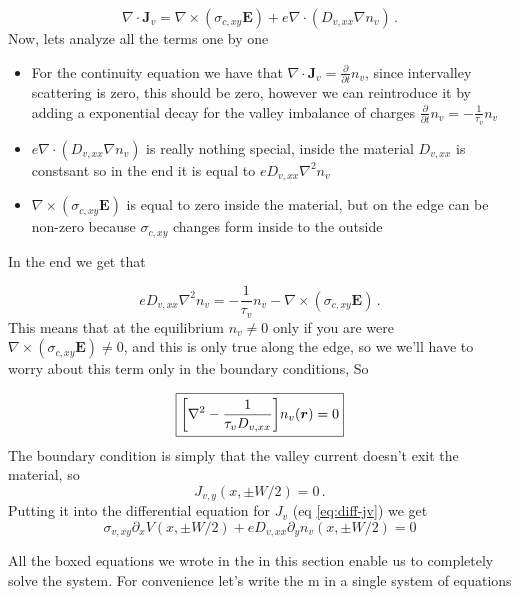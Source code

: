 \begin{equation}
    \nabla \cdot \mathbf J_v=\nabla \times (\sigma_{c,xy} \mathbf E)+ e\nabla \cdot (D_{v,xx}\nabla n_v)\,.
\end{equation}
Now, lets analyze all the terms one by one
\begin{itemize}
\item For the continuity equation we have that $\nabla \cdot \mathbf J_v=\frac \partial {\partial t} n_v$, since intervalley scattering is zero, this should be zero, however we can reintroduce it by adding a exponential decay for the valley imbalance of charges $\frac \partial {\partial t} n_v=-\frac 1 {\tau_v} n_v$
\item$e\nabla \cdot (D_{v,xx}\nabla n_v)$ is really nothing special, inside the material $D_{v,xx}$ is constsant so in the end it is equal to $eD_{v,xx}\nabla^2 n_v$
\item $\nabla \times (\sigma_{c,xy} \mathbf E)$ is equal to zero inside the material, but on the edge can be non-zero because $\sigma_{c,xy}$ changes form inside to the outside
\end{itemize}
In the end we get that


\begin{equation}
    eD_{v,xx}\nabla^2n_v=-\frac 1{\tau_v}n_v- \nabla \times (\sigma_{c,xy} \mathbf E)\,.
\end{equation}
This means that at the equilibrium $n_v\neq 0$ only if you are were $\nabla\times (\sigma_{c,xy} \mathbf E)\neq 0$, and this is only true along the edge, so we we'll have to worry about this term only in the boundary conditions, So

\begin{equation}
    \boxed{\bigg[
        \nabla^2 -\frac 1{\tau_v D_{v,xx}}
        \bigg]
    n_v(\boldsymbol{r})=0}
\end{equation}
The boundary condition is simply that the valley current doesn't exit the material, so
\begin{equation}
    J_{v,y}(x,\pm W/2)=0\,.
\end{equation}
Putting it into the differential equation for $J_v$ (eq \ref{eq:diff-jv}) we get
\begin{equation}
    \boxed{
        \sigma_{v,xy}\partial_x V(x,\pm W/2)+eD_{v,xx}\partial_y n_v(x,\pm W/2)=0
    }
\end{equation}


All the boxed equations we wrote in the in this section enable us to completely solve the system. For convenience let's write the m in a single system of equations

